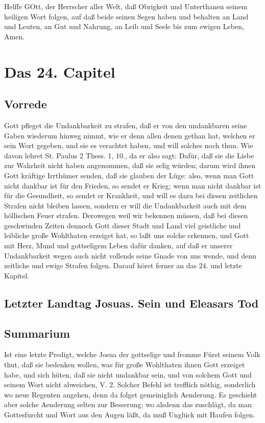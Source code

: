 Helffe GOtt, der Herrscher aller Welt, daß Obrigkeit und Unterthanen seinem heiligen Wort folgen, auf daß beide seinen Segen haben und behalten an Land und Leuten, an Gut und Nahrung, an Leib und Seele bis zum ewigen Leben, Amen.

\chapter{Das 24. Capitel}

\section{Vorrede}

Gott pfleget die Undankbarkeit zu strafen, daß er von den undankbaren seine Gaben wiederum hinweg nimmt, wie er denn allen denen gethan hat, welchen er sein Wort gegeben, und sie es verachtet haben, und will solches noch thun. Wie davon lehret St. Paulus 2 Thess. 1, 10., da er also sagt: Dafür, daß sie die Liebe zur Wahrheit nicht haben angenommen, daß sie selig würden; darum wird ihnen Gott kräftige Irrthümer senden, daß sie glauben der Lüge: also, wenn man Gott nicht dankbar ist für den Frieden, so sendet er Krieg; wenn man nicht dankbar ist für die Gesundheit, so sendet er Krankheit, und will es dazu bei diesen zeitlichen Strafen nicht bleiben lassen, sondern er will die Undankbarkeit auch mit dem höllischen Feuer strafen. Derowegen weil wir bekennen müssen, daß bei diesen geschwinden Zeiten dennoch Gott dieser Stadt und Land viel geistliche und leibliche große Wohlthaten erzeiget hat, so laßt uns solche erkennen, und Gott mit Herz, Mund und gottseligem Leben dafür danken, auf daß er unserer Undankbarkeit wegen auch nicht vollends seine Gnade von uns wende, und denn zeitliche und ewige Strafen folgen. Darauf höret ferner an das 24. und letzte Kapitel.

\section{Letzter Landtag Josuas. Sein und Eleasars Tod}
\section{Summarium}

Ist eine letzte Predigt, welche Josua der gottselige und fromme Fürst seinem Volk thut, daß sie bedenken wollen, was für große Wohlthaten ihnen Gott erzeiget habe, und sich hüten, daß sie nicht undankbar sein, und von solchem Gott und seinem Wort nicht abweichen, V. 2. Solcher Befehl ist trefflich nöthig, sonderlich wo neue Regenten angehen, denn da folget gemeiniglich Aenderung. Es geschieht aber solche Aenderung selten zur Besserung; wo alsdenn das zuschlägt, da man Gottesfurcht und Wort aus den Augen läßt, da muß Unglück mit Haufen folgen.
